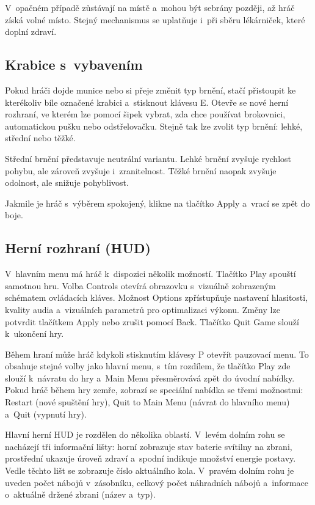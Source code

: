 V~opačném případě zůstávají na místě a~mohou být sebrány později, až hráč získá volné místo. Stejný mechanismus se uplatňuje i~při sběru lékárniček, které doplní zdraví.

\subsection{Krabice s~vybavením}
Pokud hráči dojde munice nebo si přeje změnit typ brnění, stačí přistoupit ke kterékoliv bíle označené krabici a~stisknout klávesu E. Otevře se nové herní rozhraní, ve kterém lze pomocí šipek vybrat, zda chce používat brokovnici, automatickou pušku nebo odstřelovačku. Stejně tak lze zvolit typ brnění: lehké, střední nebo těžké.

Střední brnění představuje neutrální variantu. Lehké brnění zvyšuje rychlost pohybu, ale zároveň zvyšuje i~zranitelnost. Těžké brnění naopak zvyšuje odolnost, ale snižuje pohyblivost.

Jakmile je hráč s~výběrem spokojený, klikne na tlačítko Apply a~vrací se zpět do boje.

\subsection{Herní rozhraní (HUD)}
V~hlavním menu má hráč k~dispozici několik možností. Tlačítko Play spouští samotnou hru. Volba Controls otevírá obrazovku s~vizuálně zobrazeným schématem ovládacích kláves. Možnost Options zpřístupňuje nastavení hlasitosti, kvality audia a~vizuálních parametrů pro optimalizaci výkonu. Změny lze potvrdit tlačítkem Apply nebo zrušit pomocí Back. Tlačítko Quit Game slouží k~ukončení hry.

Během hraní může hráč kdykoli stisknutím klávesy P otevřít pauzovací menu. To obsahuje stejné volby jako hlavní menu, s~tím rozdílem, že tlačítko Play zde slouží k~návratu do hry a~Main Menu přesměrovává zpět do úvodní nabídky. Pokud hráč během hry zemře, zobrazí se speciální nabídka se třemi možnostmi: Restart (nové spuštění hry), Quit to Main Menu (návrat do hlavního menu) a~Quit (vypnutí hry).

Hlavní herní HUD je rozdělen do několika oblastí. V~levém dolním rohu se nacházejí tři informační lišty: horní zobrazuje stav baterie svítilny na zbrani, prostřední ukazuje úroveň zdraví a~spodní indikuje množství energie postavy. Vedle těchto lišt se zobrazuje číslo aktuálního kola. V~pravém dolním rohu je uveden počet nábojů v~zásobníku, celkový počet náhradních nábojů a~informace o~aktuálně držené zbrani (název a~typ).

